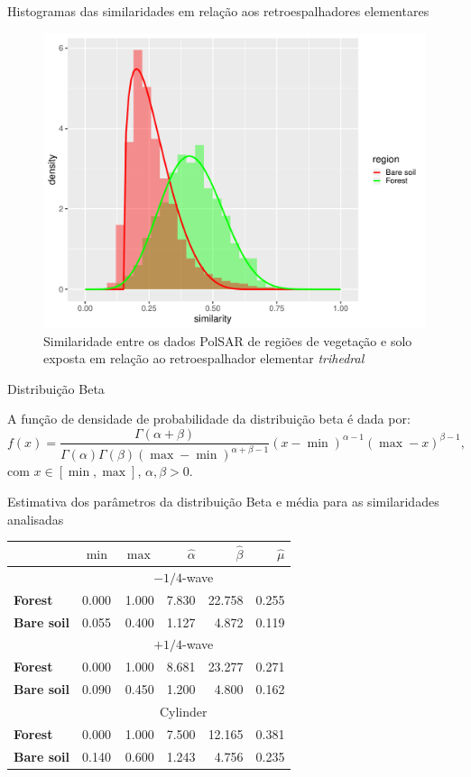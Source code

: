 \documentclass{beamer} %
\begin{document}
\begin{frame}{Histogramas das similaridades em relação aos retroespalhadores elementares}

\begin{figure}
    \centering
    \includegraphics[width = .6\linewidth]{tr.pdf}
    \caption{Similaridade entre os dados PolSAR de regiões de vegetação e solo exposta em relação ao retroespalhador elementar \textit{trihedral}}
    \label{fig:tr}
\end{figure}
    
\end{frame}

\begin{frame}{Distribuição Beta}

A função de densidade de probabilidade da distribuição beta é dada por:
$$
f(x) = \frac{\Gamma(\alpha+\beta)}{\Gamma(\alpha)\Gamma(\beta)(\max - \min)^{\alpha + \beta - 1}}(x - \min)^{\alpha-1}(\max-x)^{\beta-1},
$$
com $x \in [\min, \max]$, $\alpha,\beta>0$.
    
\end{frame}

\begin{frame}{Estimativa dos parâmetros da distribuição Beta e média para as similaridades analisadas}
\begin{table}[hbt]
\centering
\begin{tabular}{lrrrrr}
\toprule
& $\min$ & $\max$ & $\widehat\alpha$ & $\widehat\beta$ & $\widehat\mu$\\ \midrule
& \multicolumn{5}{c}{$-1/4$-wave}\\
\cmidrule(lr){2-6}
\textbf{Forest} & 0.000 & 1.000 & 7.830 & 22.758 & 0.255\\
\textbf{Bare soil} & 0.055 & 0.400 & 1.127 & 4.872 & 0.119\\
\midrule
%
& \multicolumn{5}{c}{$+1/4$-wave}\\
\cmidrule(lr){2-6}
\textbf{Forest} & 0.000 & 1.000 & 8.681 & 23.277 & 0.271\\
\textbf{Bare soil} & 0.090 & 0.450 & 1.200 & 4.800 & 0.162\\
\midrule
%
& \multicolumn{5}{c}{Cylinder}\\
\cmidrule(lr){2-6}
\textbf{Forest} & 0.000 & 1.000 & 7.500 & 12.165 & 0.381\\
\textbf{Bare soil} & 0.140 & 0.600 & 1.243 & 4.756 & 0.235\\
\bottomrule
\end{tabular}
\end{table}
\end{frame}
\end{document}
